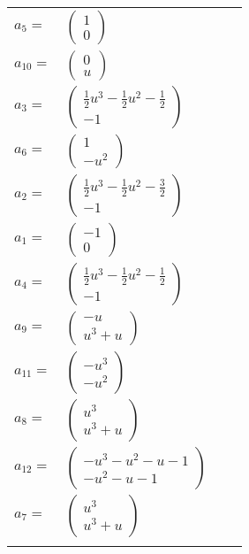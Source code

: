 \documentclass[1p]{elsarticle_modified}
\theoremstyle{definition}
\begin{document}
\begin{tabular}{m{7pt} m{180pt} m{7pt} m{180pt} }
\flushright $a_{5}=$&$\begin{pmatrix}1\\0\end{pmatrix}$ \\
\flushright $a_{10}=$&$\begin{pmatrix}0\\u\end{pmatrix}$ \\
\flushright $a_{3}=$&$\begin{pmatrix}\frac{1}{2} u^3-\frac{1}{2} u^2-\frac{1}{2}\\-1\end{pmatrix}$ \\
\flushright $a_{6}=$&$\begin{pmatrix}1\\- u^2\end{pmatrix}$ \\
\flushright $a_{2}=$&$\begin{pmatrix}\frac{1}{2} u^3-\frac{1}{2} u^2-\frac{3}{2}\\-1\end{pmatrix}$ \\
\flushright $a_{1}=$&$\begin{pmatrix}-1\\0\end{pmatrix}$ \\
\flushright $a_{4}=$&$\begin{pmatrix}\frac{1}{2} u^3-\frac{1}{2} u^2-\frac{1}{2}\\-1\end{pmatrix}$ \\
\flushright $a_{9}=$&$\begin{pmatrix}- u\\u^3+u\end{pmatrix}$ \\
\flushright $a_{11}=$&$\begin{pmatrix}- u^3\\- u^2\end{pmatrix}$ \\
\flushright $a_{8}=$&$\begin{pmatrix}u^3\\u^3+u\end{pmatrix}$ \\
\flushright $a_{12}=$&$\begin{pmatrix}- u^3- u^2- u-1\\- u^2- u-1\end{pmatrix}$ \\
\flushright $a_{7}=$&$\begin{pmatrix}u^3\\u^3+u\end{pmatrix}$\\&\end{tabular}
\end{document}
